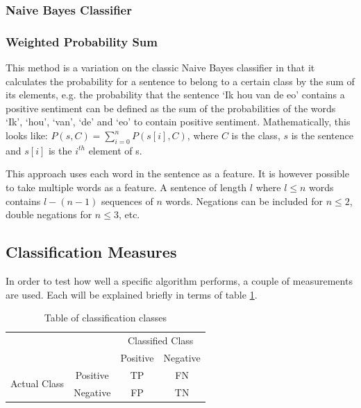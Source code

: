 \documentclass[11pt]{article}
\begin{document}
\subsubsection{Naive Bayes Classifier}

\subsubsection{Weighted Probability Sum}
This method is a variation on the classic Naive Bayes classifier in that it calculates the probability for a sentence to belong to a certain class by the sum of its elements, e.g. the probability that the sentence `Ik hou van de eo' contains a positive sentiment can be defined as the sum of the probabilities of the words `Ik', `hou', `van', `de' and `eo' to contain positive sentiment. Mathematically, this looks like:
$\displaystyle P(s, C) = \sum_{i=0}^n P( s[i], C )$, where $C$ is the class, $s $ is the sentence and $s[i]$ is the $i^{th}$ element of s. 

This approach uses each word in the sentence as a feature. It is however possible to take multiple words as a feature. A sentence of length $l$ where $l \leq n$ words contains $l - (n-1)$ sequences of $n$ words. Negations can be included for $n \leq 2$, double negations for $n \leq 3$, etc. 


\subsection{Classification Measures}

In order to test how well a specific algorithm performs, a couple of measurements are used. Each will be explained briefly in terms of table \ref{classification}.

\begin{table}[h]
\center
\begin{tabular}{cc|c|c|}
\cline{3-4}
& & \multicolumn{2}{|c|}{Classified Class} \\ \cline{3-4}
& &  Positive & Negative \\ \cline{1-4}
\multicolumn{1}{|c|}{\multirow{2}{*}{Actual Class}} &
\multicolumn{1}{|c|}{Positive} &  TP & FN      \\ \cline{2-4}
\multicolumn{1}{|c|}{}                        &
\multicolumn{1}{|c|}{Negative} & FP & TN     \\ \cline{1-4}
\end{tabular}
\caption{Table of classification classes}
\label{classification}
\end{table} 
\end{document}
